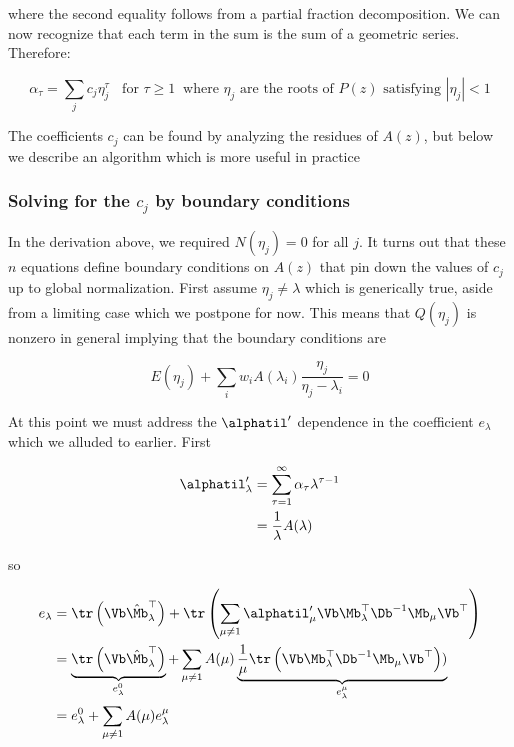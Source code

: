 \documentclass{article}
\begin{document}
where the second equality follows from a partial fraction decomposition. We can now recognize that each term in the sum is the sum of a geometric series. Therefore:

\begin{equation}\label{sumofgeo}
    \alpha_\tau = \sum_{j} c_j \eta_j^\tau \;\; \textrm{ for } \tau \ge 1 \;\; \text{where $\eta_j$ are the roots of $P(z)$ satisfying $|\eta_j| < 1$}
\end{equation}

The coefficients $c_j$ can be found by analyzing the residues of $A(z)$, but below we describe an algorithm which is more useful in practice

\subsubsection{Solving for the $c_j$ by boundary conditions}\label{sec:selfcons}
In the derivation above, we required $N(\eta_j) = 0$ for all $j$. It turns out that these $n$ equations define boundary conditions on $A(z)$ that pin down the values of $c_j$ up to global normalization. First assume $\eta_j \neq \lambda$ which is generically true, aside from a limiting case which we postpone for now. This means that $Q(\eta_j)$ is nonzero in general implying that the boundary conditions are

\begin{equation}\label{selfcons}
    E(\eta_j) + \sum_{i}w_i A(\lambda_i) \frac{\eta_j}{\eta_j - \lambda_i} = 0
\end{equation}

At this point we must address the $\alphatil'$ dependence in the coefficient $e_\lambda$ which we alluded to earlier. First

\begin{align}
    \alphatil'_\lambda &= \sum_{\tau=1}^\infty \alpha_\tau \lambda^{\tau-1} \\
    &= \frac{1}{\lambda}A(\lambda)
\end{align}

so

\begin{align}
    e_\lambda &= \tr\left( \Vb \hat{\Mb}_\lambda^\top\right) + \tr\left(\sum_{\mu \neq1} \alphatil'_\mu \Vb \Mb_\lambda^\top \Db^{-1}\Mb_\mu\Vb^\top \right) \\
    &= \underbrace{\tr\left( \Vb \hat{\Mb}_\lambda^\top\right)}_{e_\lambda^0} 
    + \sum_{\mu\neq 1}A(\mu) \underbrace{\frac{1}{\mu}\tr\left(\Vb \Mb_\lambda^\top \Db^{-1}\Mb_\mu\Vb^\top \right))}_{e_\lambda^\mu} \\
    &= e_\lambda^0 + \sum_{\mu\neq 1}A(\mu)e_\lambda^\mu
\end{align}
\end{document}
